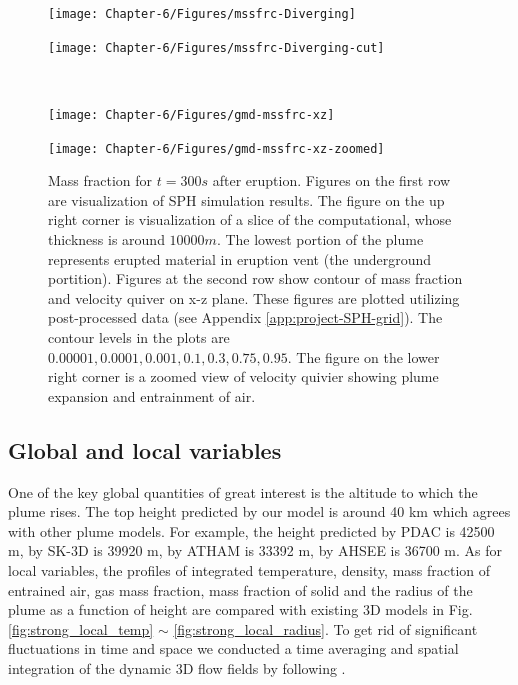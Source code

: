 \begin{figure}
    \centering
    \begin{minipage}{.45\textwidth}
        \centering
        \texttt{[image: Chapter-6/Figures/mssfrc-Diverging]}
    \end{minipage}%
    \begin{minipage}{.45 \textwidth}
        \centering
        \texttt{[image: Chapter-6/Figures/mssfrc-Diverging-cut]}
    \end{minipage}%
    \\
    \begin{minipage}{.45 \textwidth}
        \centering
        \texttt{[image: Chapter-6/Figures/gmd-mssfrc-xz]}
    \end{minipage}%
    \begin{minipage}{.45 \textwidth}
        \centering
        \texttt{[image: Chapter-6/Figures/gmd-mssfrc-xz-zoomed]}
    \end{minipage}%
    \caption{Mass fraction for $t=300s$ after eruption. Figures on the first row are visualization of SPH simulation results. The figure on the up right corner is visualization of a slice of the computational, whose thickness is around $10000m$. The lowest portion of the plume represents erupted material in eruption vent (the underground portition). Figures at the second row show contour of mass fraction and velocity quiver on x-z plane. These figures are plotted utilizing post-processed data (see Appendix \ref{app:project-SPH-grid}). The contour levels in the plots are $0.00001, 0.0001, 0.001, 0.1, 0.3, 0.75, 0.95$. The figure on the lower right corner is a zoomed view of velocity quivier showing plume expansion and entrainment of air.}
    \label{fig:pinatubo-simulation-results-vis}
\end{figure}

\subsection{Global and local variables}
One of the key global quantities of great interest is the altitude to which the plume rises. The top height predicted by our model is around 40 km which agrees with other plume models. For example, the height predicted by PDAC is 42500 m, by SK-3D is 39920 m, by ATHAM is 33392 m, by AHSEE is 36700 m. As for local variables, the profiles of integrated temperature, density, mass fraction of entrained air, gas mass fraction, mass fraction of solid and the radius of the plume as a function of height are compared with existing 3D models in Fig. \ref{fig:strong_local_temp} $\sim$ \ref{fig:strong_local_radius}. To get rid of significant fluctuations in time and space we conducted a time averaging and spatial integration of the dynamic 3D flow fields by following \citet {cerminara2016large}.

